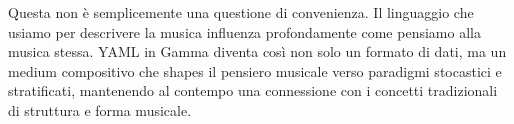 Questa non è semplicemente una questione di convenienza. Il linguaggio che usiamo per descrivere la musica influenza profondamente come pensiamo alla musica stessa. YAML in Gamma diventa così non solo un formato di dati, ma un medium compositivo che shapes il pensiero musicale verso paradigmi stocastici e stratificati, mantenendo al contempo una connessione con i concetti tradizionali di struttura e forma musicale.